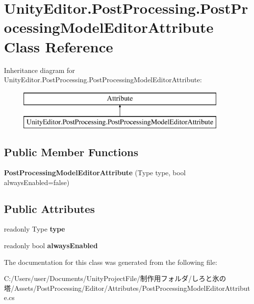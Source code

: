 \hypertarget{class_unity_editor_1_1_post_processing_1_1_post_processing_model_editor_attribute}{}\section{Unity\+Editor.\+Post\+Processing.\+Post\+Processing\+Model\+Editor\+Attribute Class Reference}
\label{class_unity_editor_1_1_post_processing_1_1_post_processing_model_editor_attribute}
Inheritance diagram for Unity\+Editor.\+Post\+Processing.\+Post\+Processing\+Model\+Editor\+Attribute\+:\begin{figure}[H]
\begin{center}
\leavevmode
\includegraphics[height=2.000000cm]{class_unity_editor_1_1_post_processing_1_1_post_processing_model_editor_attribute}
\end{center}
\end{figure}
\subsection*{Public Member Functions}
\begin{DoxyCompactItemize}
\item 
\mbox{\label{class_unity_editor_1_1_post_processing_1_1_post_processing_model_editor_attribute_a16868845236576459a018d59a09b3e4a}} 
{\bfseries Post\+Processing\+Model\+Editor\+Attribute} (Type type, bool always\+Enabled=false)
\end{DoxyCompactItemize}
\subsection*{Public Attributes}
\begin{DoxyCompactItemize}
\item 
\mbox{\label{class_unity_editor_1_1_post_processing_1_1_post_processing_model_editor_attribute_aa09b0eb015705ec04ab6161174fbe227}} 
readonly Type {\bfseries type}
\item 
\mbox{\label{class_unity_editor_1_1_post_processing_1_1_post_processing_model_editor_attribute_a3f037dfd948be211f3d86c91dc28cdfe}} 
readonly bool {\bfseries always\+Enabled}
\end{DoxyCompactItemize}


The documentation for this class was generated from the following file\+:\begin{DoxyCompactItemize}
\item 
C\+:/\+Users/user/\+Documents/\+Unity\+Project\+File/制作用フォルダ/しろと氷の塔/\+Assets/\+Post\+Processing/\+Editor/\+Attributes/Post\+Processing\+Model\+Editor\+Attribute.\+cs\end{DoxyCompactItemize}
